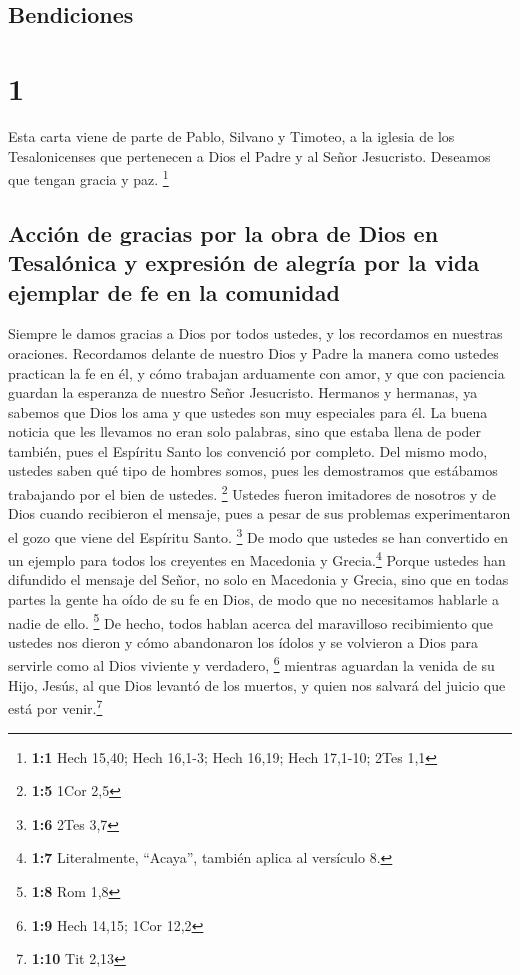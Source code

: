 \hypertarget{bendiciones}{%
\subsection{Bendiciones}\label{bendiciones}}

\hypertarget{section}{%
\section{1}\label{section}}

 Esta carta viene de parte de Pablo, Silvano y Timoteo, a
la iglesia de los Tesalonicenses que pertenecen a Dios el Padre y al
Señor Jesucristo. Deseamos que tengan gracia y paz. \footnote{\textbf{1:1}
  Hech 15,40; Hech 16,1-3; Hech 16,19; Hech 17,1-10; 2Tes 1,1}

\hypertarget{acciuxf3n-de-gracias-por-la-obra-de-dios-en-tesaluxf3nica-y-expresiuxf3n-de-alegruxeda-por-la-vida-ejemplar-de-fe-en-la-comunidad}{%
\subsection{Acción de gracias por la obra de Dios en Tesalónica y
expresión de alegría por la vida ejemplar de fe en la
comunidad}\label{acciuxf3n-de-gracias-por-la-obra-de-dios-en-tesaluxf3nica-y-expresiuxf3n-de-alegruxeda-por-la-vida-ejemplar-de-fe-en-la-comunidad}}

 Siempre le damos gracias a Dios por todos ustedes, y los
recordamos en nuestras oraciones.  Recordamos delante de
nuestro Dios y Padre la manera como ustedes practican la fe en él, y
cómo trabajan arduamente con amor, y que con paciencia guardan la
esperanza de nuestro Señor Jesucristo.  Hermanos y
hermanas, ya sabemos que Dios los ama y que ustedes son muy especiales
para él.  La buena noticia que les llevamos no eran solo
palabras, sino que estaba llena de poder también, pues el Espíritu Santo
los convenció por completo. Del mismo modo, ustedes saben qué tipo de
hombres somos, pues les demostramos que estábamos trabajando por el bien
de ustedes. \footnote{\textbf{1:5} 1Cor 2,5}  Ustedes
fueron imitadores de nosotros y de Dios cuando recibieron el mensaje,
pues a pesar de sus problemas experimentaron el gozo que viene del
Espíritu Santo. \footnote{\textbf{1:6} 2Tes 3,7}  De modo
que ustedes se han convertido en un ejemplo para todos los creyentes en
Macedonia y Grecia.\footnote{\textbf{1:7} Literalmente, ``Acaya'',
  también aplica al versículo 8.}  Porque ustedes han
difundido el mensaje del Señor, no solo en Macedonia y Grecia, sino que
en todas partes la gente ha oído de su fe en Dios, de modo que no
necesitamos hablarle a nadie de ello. \footnote{\textbf{1:8} Rom 1,8}
 De hecho, todos hablan acerca del maravilloso
recibimiento que ustedes nos dieron y cómo abandonaron los ídolos y se
volvieron a Dios para servirle como al Dios viviente y verdadero,
\footnote{\textbf{1:9} Hech 14,15; 1Cor 12,2}  mientras
aguardan la venida de su Hijo, Jesús, al que Dios levantó de los
muertos, y quien nos salvará del juicio que está por venir.\footnote{\textbf{1:10}
  Tit 2,13}

